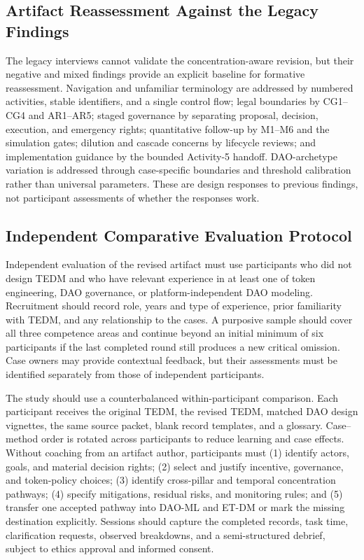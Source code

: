 \documentclass[referee,sn-basic]{sn-jnl}
\begin{document}
\subsection{Artifact Reassessment Against the Legacy Findings}
\label{subsec:tedm-reassessment}

The legacy interviews cannot validate the concentration-aware revision, but
their negative and mixed findings provide an explicit baseline for formative
reassessment. Navigation and unfamiliar terminology are addressed by numbered
activities, stable identifiers, and a single control flow; legal boundaries by
CG1--CG4 and AR1--AR5; staged governance by separating proposal, decision,
execution, and emergency rights; quantitative follow-up by M1--M6 and the
simulation gates; dilution and cascade concerns by lifecycle reviews; and
implementation guidance by the bounded Activity-5 handoff. DAO-archetype
variation is addressed through case-specific boundaries and threshold
calibration rather than universal parameters. These are design responses to
previous findings, not participant assessments of whether the responses work.

\subsection{Independent Comparative Evaluation Protocol}
\label{subsec:independent-evaluation}

Independent evaluation of the revised artifact must use participants who did
not design TEDM and who have relevant experience in at least one of token
engineering, DAO governance, or platform-independent DAO modeling. Recruitment
should record role, years and type of experience, prior familiarity with TEDM,
and any relationship to the cases. A purposive sample should cover all three
competence areas and continue beyond an initial minimum of six participants if
the last completed round still produces a new critical omission. Case owners
may provide contextual feedback, but their assessments must be identified
separately from those of independent participants.

The study should use a counterbalanced within-participant comparison. Each
participant receives the original TEDM, the revised TEDM, matched DAO design
vignettes, the same source packet, blank record templates, and a glossary.
Case--method order is rotated across participants to reduce learning and case
effects. Without coaching from an artifact author, participants must (1)
identify actors, goals, and material decision rights; (2) select and justify
incentive, governance, and token-policy choices; (3) identify cross-pillar and
temporal concentration pathways; (4) specify mitigations, residual risks, and
monitoring rules; and (5) transfer one accepted pathway into DAO-ML and ET-DM
or mark the missing destination explicitly. Sessions should capture the
completed records, task time, clarification requests, observed breakdowns, and
a semi-structured debrief, subject to ethics approval and informed consent.
\end{document}

